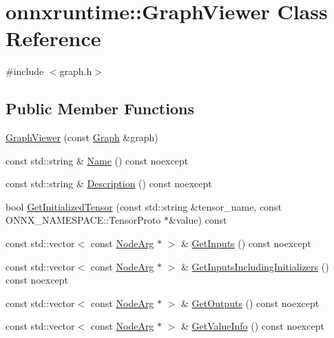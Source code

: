 \hypertarget{classonnxruntime_1_1GraphViewer}{}\section{onnxruntime\+:\+:Graph\+Viewer Class Reference}
\label{classonnxruntime_1_1GraphViewer}


{\ttfamily \#include $<$graph.\+h$>$}

\subsection*{Public Member Functions}
\begin{DoxyCompactItemize}
\item 
\mbox{\hyperlink{classonnxruntime_1_1GraphViewer_a1e00fee3a376800a386a9ff632785e60}{Graph\+Viewer}} (const \mbox{\hyperlink{classonnxruntime_1_1Graph}{Graph}} \&graph)
\item 
const std\+::string \& \mbox{\hyperlink{classonnxruntime_1_1GraphViewer_ae3759522c35f54fffb7ca164218b5a18}{Name}} () const noexcept
\item 
const std\+::string \& \mbox{\hyperlink{classonnxruntime_1_1GraphViewer_a1d74a922adecb9759a4aa7ad79b944b5}{Description}} () const noexcept
\item 
bool \mbox{\hyperlink{classonnxruntime_1_1GraphViewer_ad097d3796e17076e45eab1c5f435b272}{Get\+Initialized\+Tensor}} (const std\+::string \&tensor\+\_\+name, const O\+N\+N\+X\+\_\+\+N\+A\+M\+E\+S\+P\+A\+C\+E\+::\+Tensor\+Proto $\ast$\&value) const
\item 
const std\+::vector$<$ const \mbox{\hyperlink{classonnxruntime_1_1NodeArg}{Node\+Arg}} $\ast$ $>$ \& \mbox{\hyperlink{classonnxruntime_1_1GraphViewer_aee4ecc6e53635c7de6056e45f9e7d0af}{Get\+Inputs}} () const noexcept
\item 
const std\+::vector$<$ const \mbox{\hyperlink{classonnxruntime_1_1NodeArg}{Node\+Arg}} $\ast$ $>$ \& \mbox{\hyperlink{classonnxruntime_1_1GraphViewer_aa1d445709d7c1348a2821a566bd8ae5d}{Get\+Inputs\+Including\+Initializers}} () const noexcept
\item 
const std\+::vector$<$ const \mbox{\hyperlink{classonnxruntime_1_1NodeArg}{Node\+Arg}} $\ast$ $>$ \& \mbox{\hyperlink{classonnxruntime_1_1GraphViewer_aa61861e1e355026a7fef98fc374a3b23}{Get\+Outputs}} () const noexcept
\item 
const std\+::vector$<$ const \mbox{\hyperlink{classonnxruntime_1_1NodeArg}{Node\+Arg}} $\ast$ $>$ \& \mbox{\hyperlink{classonnxruntime_1_1GraphViewer_a86d02dde7f7ef35ace579fe6c1009651}{Get\+Value\+Info}} () const noexcept

\end{DoxyCompactItemize}
